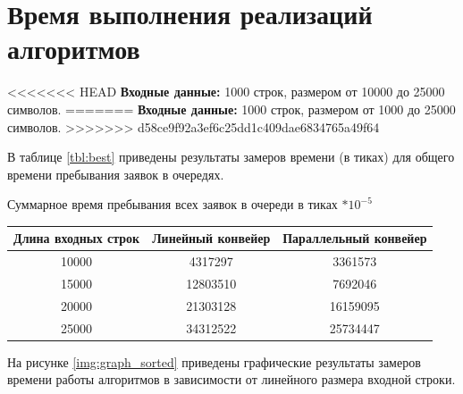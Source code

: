 \section{Время выполнения реализаций алгоритмов}

<<<<<<< HEAD
\textbf{Входные данные:} 1000 строк, размером от 10000 до 25000 символов.
=======
\textbf{Входные данные:} 1000 строк, размером от 1000 до 25000 символов.
>>>>>>> d58ce9f92a3ef6c25dd1c409dae6834765a49f64

В таблице \ref{tbl:best} приведены результаты замеров времени (в тиках) для общего времени пребывания заявок в очередях.

\begin{center}
	\begin{threeparttable}
		\caption{Суммарное время пребывания всех заявок в очереди в тиках $* 10^{-5}$}
		\label{tbl:best}
		\begin{tabular}{|c|c|c|}
			\hline
			Длина входных строк &Линейный конвейер &Параллельный конвейер\\
			\hline
			10000 & 4317297& 3361573 \\
			\hline
		    15000&12803510 &7692046 \\
		    \hline
		    20000&21303128 & 16159095\\
			\hline
		    25000 & 34312522&25734447 \\
			\hline
		\end{tabular}
		
	\end{threeparttable}
\end{center}


 На рисунке \ref{img:graph_sorted} приведены графические результаты замеров времени работы алгоритмов в зависимости от линейного размера входной строки.

\begin{center}
	\label{img:graph_sorted}
\end{center}





